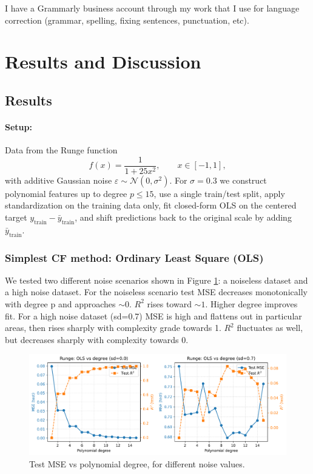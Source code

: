 \documentclass[amssymb,twocolumn,aps]{revtex4-2}
\begin{document}
I have a Grammarly business account through my work that I use for language correction (grammar, spelling, fixing sentences, punctuation, etc). 
	
\section{Results and Discussion}\label{section:results} 

\subsection{Results}

\paragraph{Setup:}
Data from the Runge function
\[
f(x)=\frac{1}{1+25x^{2}}, \qquad x\in[-1,1],
\]
with additive Gaussian noise \(\varepsilon\sim\mathcal N(0,\sigma^{2})\).
For $\sigma = 0.3$  we construct polynomial features up to
degree \(p\le 15\), use a single train/test split, apply standardization
on the training data only, fit closed-form OLS on the centered target
\(y_{\text{train}}-\bar y_{\text{train}}\), and shift predictions back to the
original scale by adding \(\bar y_{\text{train}}\).

\subsubsection{Simplest CF method: Ordinary Least Square (OLS)}

We tested two different noise scenarios shown in Figure \ref{fig:ols_vs_degree}: a noiseless dataset and a high noise dataset. For the noiseless scenario test MSE decreases monotonically with degree p and approaches $\sim 0$. $R^2$ rises toward $\sim 1$. Higher degree improves fit. For a high noise dataset (sd=0.7) MSE is high and flattens out in particular areas, then rises sharply with complexity grade towards 1. $R^2$ fluctuates as well, but decreases sharply with complexity towards 0. 

\begin{figure}[H]
    \centering
    \includegraphics[width=1\linewidth]{Project-1/Figures/runge_ols_mse_r2_vs_degree.png}
    \caption{Test MSE vs polynomial degree, for different noise values.}
    \label{fig:ols_vs_degree}
\end{figure}
\end{document}
